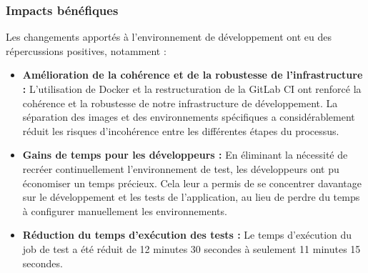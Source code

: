 \subsubsection{Impacts bénéfiques}
Les changements apportés à l'environnement de développement ont eu des répercussions positives, notamment :
\begin{itemize}
    \item \textbf{Amélioration de la cohérence et de la robustesse de l'infrastructure :} L'utilisation de Docker et la restructuration de la GitLab CI ont renforcé la cohérence et la robustesse de notre infrastructure de développement.
    La séparation des images et des environnements spécifiques a considérablement réduit les risques d'incohérence entre les différentes étapes du processus.
    \item \textbf{Gains de temps pour les développeurs :} En éliminant la nécessité de recréer continuellement l'environnement de test, les développeurs ont pu économiser un temps précieux.
    Cela leur a permis de se concentrer davantage sur le développement et les tests de l'application, au lieu de perdre du temps à configurer manuellement les environnements.
    \item \textbf{Réduction du temps d'exécution des tests :} Le temps d'exécution du job de test a été réduit de 12 minutes 30 secondes à seulement 11 minutes 15 secondes.
\end{itemize}